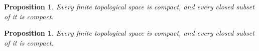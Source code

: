 \documentclass{article}
\newtheorem{proposition}{Proposition}
\newtheorem*{proposition*}{Proposition}
\begin{document}
\begin{proposition} Every finite topological space is compact, and every closed subset of it is compact. \end{proposition}
\begin{proposition*} Every finite topological space is compact, and every closed subset of it is compact. \end{proposition*}
\end{document}
